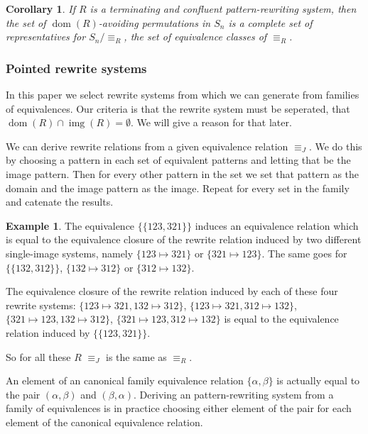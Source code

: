 \documentclass[a4paper, 11pt, english]{article}
\newcommand{\patternrule}{ \mapsto \!}
\newtheorem{corollary}[theorem]{Corollary}
\theoremstyle{definition}
\newtheorem{example}[theorem]{Example}
\DeclareMathOperator{\dom}{dom}
\DeclareMathOperator{\img}{img}
\begin{document}
\begin{corollary}
    If $R$ is a terminating and confluent pattern-rewriting system, then the set
    of $\dom(R)$-avoiding permutations in $S_n$ is a complete set of
    representatives for $S_n / \equiv_R$, the set of equivalence classes of
    $\equiv_R$.
\end{corollary}

\subsubsection{Pointed rewrite systems}


In this paper we select rewrite systems from which we can generate from families of equivalences.
Our criteria is that the rewrite system must be seperated, that $\dom(R) \cap \img(R) = \emptyset$.
We will give a reason for that later.

We can derive rewrite relations from a given equivalence relation $\equiv_J$.
We do this by choosing a pattern in each set of equivalent patterns and letting
that be the image pattern. Then for every other pattern in the set we set that
pattern as the domain and the image pattern as the image. Repeat for every set
in the family and catenate the results.

\begin{example}
    The equivalence $\{ \{123, 321 \} \}$ induces an equivalence relation which is
    equal to the equivalence closure of the rewrite relation induced by two
    different single-image systems, namely $\{123 \patternrule 321\}$ or $\{321
    \patternrule 123\}$. The same goes for $\{ \{ 132, 312 \} \}$, $\{132 \patternrule
    312\}$ or $\{312 \patternrule 132\}$.

    The equivalence closure of the rewrite relation induced by each of these
    four rewrite systems: $\{123 \patternrule 321, 132 \patternrule 312\}$, $\{123
    \patternrule 321, 312 \patternrule 132\}$, $\{321 \patternrule 123, 132
    \patternrule 312\}$, $\{321 \patternrule 123, 312 \patternrule 132\}$ is
    equal to the equivalence relation induced by $\{ \{ 123, 321 \} \}$.

    So for all these $R$ $\equiv_J$ is the same as $\equiv_R$.
\end{example}

An element of an canonical family equivalence relation $\{ \alpha, \beta \}$ is
actually equal to the pair $(\alpha, \beta)$ and $(\beta, \alpha)$.
Deriving an pattern-rewriting system from a family of equivalences is in
practice choosing either element of the pair for each element of the canonical
equivalence relation.
\end{document}
